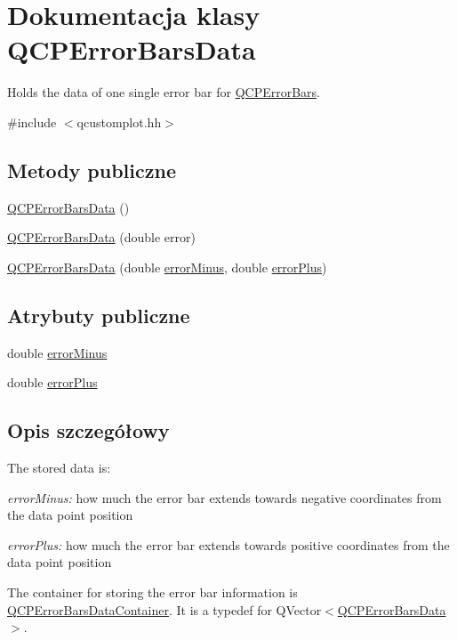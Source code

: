 \hypertarget{class_q_c_p_error_bars_data}{}\section{Dokumentacja klasy Q\+C\+P\+Error\+Bars\+Data}
\label{class_q_c_p_error_bars_data}


Holds the data of one single error bar for \hyperlink{class_q_c_p_error_bars}{Q\+C\+P\+Error\+Bars}.  




{\ttfamily \#include $<$qcustomplot.\+hh$>$}

\subsection*{Metody publiczne}
\begin{DoxyCompactItemize}
\item 
\hyperlink{class_q_c_p_error_bars_data_ac18bdb46dec56f8df7f3c99d058cc725}{Q\+C\+P\+Error\+Bars\+Data} ()
\item 
\hyperlink{class_q_c_p_error_bars_data_a73ebdaa55fa7f0052b70895b28edb444}{Q\+C\+P\+Error\+Bars\+Data} (double error)
\item 
\hyperlink{class_q_c_p_error_bars_data_a7c61e42d87aea3312262d5429bc28387}{Q\+C\+P\+Error\+Bars\+Data} (double \hyperlink{class_q_c_p_error_bars_data_af8aaea160e52c14c57836224ee78020b}{error\+Minus}, double \hyperlink{class_q_c_p_error_bars_data_ad1283c99fbfccf37a0226b1df52f0776}{error\+Plus})
\end{DoxyCompactItemize}
\subsection*{Atrybuty publiczne}
\begin{DoxyCompactItemize}
\item 
double \hyperlink{class_q_c_p_error_bars_data_af8aaea160e52c14c57836224ee78020b}{error\+Minus}
\item 
double \hyperlink{class_q_c_p_error_bars_data_ad1283c99fbfccf37a0226b1df52f0776}{error\+Plus}
\end{DoxyCompactItemize}


\subsection{Opis szczegółowy}
The stored data is\+: \begin{DoxyItemize}
\item {\itshape error\+Minus\+:} how much the error bar extends towards negative coordinates from the data point position \item {\itshape error\+Plus\+:} how much the error bar extends towards positive coordinates from the data point position\end{DoxyItemize}
The container for storing the error bar information is \hyperlink{qcustomplot_8hh_a8c4472a4da738e0ddbf6b03222c39906}{Q\+C\+P\+Error\+Bars\+Data\+Container}. It is a typedef for {\ttfamily Q\+Vector$<$\hyperlink{class_q_c_p_error_bars_data}{Q\+C\+P\+Error\+Bars\+Data}$>$}.

